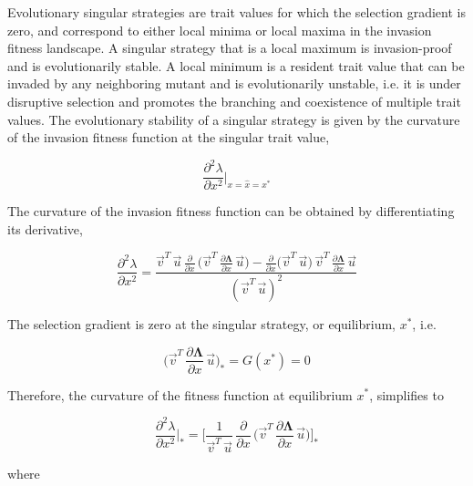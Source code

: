 Evolutionary singular strategies are trait values for which the selection gradient is zero, and correspond to either local minima or local maxima in the invasion fitness landscape. A singular strategy that is a local maximum is invasion-proof and is evolutionarily stable. A local minimum is a resident trait value that can be invaded by any neighboring mutant and is evolutionarily unstable, i.e. it is under disruptive selection and promotes the branching and coexistence of multiple trait values. The evolutionary stability of a singular strategy is given by the curvature of the invasion fitness function at the singular trait value,

\begin{equation}
    \frac{\partial^2 \lambda}{\partial x^2}\bigg|_{x=\hat{x}=x^*}
\end{equation}

The curvature of the invasion fitness function can be obtained by differentiating its derivative,

\begin{equation}
    \frac{\partial^2 \lambda}{\partial x^2} = \frac{\overrightarrow{v}^T\,\overrightarrow{u}\,\frac{\partial}{\partial x}\,\big(\overrightarrow{v}^T\,\frac{\partial \pmb{\Lambda}}{\partial x}\,\overrightarrow{u}\big) - \frac{\partial}{\partial x} \big( \overrightarrow{v}^T \, \overrightarrow{u} \big) \, \overrightarrow{v}^T \, \frac{\partial \pmb{\Lambda}}{\partial x}\,\overrightarrow{u}}{(\overrightarrow{v}^T\,\overrightarrow{u})^2}
\end{equation}

The selection gradient is zero at the singular strategy, or equilibrium, $x^*$, i.e.

\begin{equation}
    \bigg( \overrightarrow{v}^T\,\frac{
    \partial \pmb \Lambda}{\partial x}\,\overrightarrow{u} \bigg)_* = G(x^*) = 0
\end{equation}

Therefore, the curvature of the fitness function at equilibrium $x^*$, simplifies to

\begin{equation}
    \frac{\partial^2 \lambda}{\partial x^2}\bigg|_* = \Bigg[ \frac{1}{\overrightarrow{v}^T\,\overrightarrow{u}}\,\frac{\partial}{\partial x}\,\bigg(\overrightarrow{v}^T\,\frac{\partial \pmb{\Lambda}}{\partial x}\,\overrightarrow{u}\bigg) \Bigg]_*
    \label{eq:fitness_curvature_equilibrium}
\end{equation}

where


